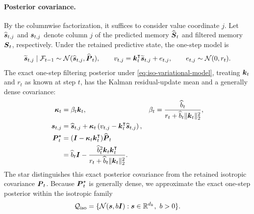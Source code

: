 \documentclass[11pt,letterpaper,logo]{yalearxiv}
\begin{document}
\paragraph{Posterior covariance.}
By the columnwise factorization, it suffices to consider value coordinate $j$. Let
$\widehat{\boldsymbol{s}}_{t,j}$ and $\boldsymbol{s}_{t,j}$ denote column $j$ of the predicted memory
$\widehat{\boldsymbol{S}}_t$ and filtered memory $\boldsymbol{S}_t$, respectively. Under the retained predictive
state, the one-step model is
\begin{equation}
  \widetilde{\boldsymbol{s}}_{t,j}\mid\mathcal{F}_{t-1}
  \sim\mathcal N(\widehat{\boldsymbol{s}}_{t,j},\widehat{\boldsymbol{P}}_t),
  \qquad
  v_{t,j}=\boldsymbol{k}_t^{\intercal}\widetilde{\boldsymbol{s}}_{t,j}+e_{t,j},
  \qquad
  e_{t,j}\sim\mathcal N(0,r_t).
  \label{eq:iso-variational-model}
\end{equation}
The exact one-step filtering posterior under \eqref{eq:iso-variational-model}, treating
$\boldsymbol{k}_t$ and $r_t$ as known at step $t$, has the Kalman residual-update mean and a generally
dense covariance:
\begin{equation}
\begin{aligned}
  \boldsymbol{\kappa}_t
  &=\beta_t\boldsymbol{k}_t,
  &
  \beta_t
  &=\frac{\widehat b_t}{r_t+\widehat b_t\|\boldsymbol{k}_t\|_2^2},
  \\
  \boldsymbol{s}_{t,j}
  &=\widehat{\boldsymbol{s}}_{t,j}
    +\boldsymbol{\kappa}_t
      \left(v_{t,j}-\boldsymbol{k}_t^{\intercal}\widehat{\boldsymbol{s}}_{t,j}\right),
  \\
  \boldsymbol{P}_t^\star
  &=(\boldsymbol{I}-\boldsymbol{\kappa}_t\boldsymbol{k}_t^{\intercal})\widehat{\boldsymbol{P}}_t
  \\
  &=\widehat b_t\boldsymbol{I}
   -\frac{\widehat b_t^2\boldsymbol{k}_t\boldsymbol{k}_t^{\intercal}}
    {r_t+\widehat b_t\|\boldsymbol{k}_t\|_2^2}.
\end{aligned}
  \label{eq:iso-exact-posterior}
\end{equation}
The star distinguishes this exact posterior covariance from the retained isotropic covariance
$\boldsymbol{P}_t$. Because $\boldsymbol{P}_t^\star$ is generally dense, we approximate the exact one-step
posterior within the isotropic family
\begin{equation*}
  \mathcal{Q}_{\mathrm{iso}}
  =\{\mathcal N(\boldsymbol{s},b\boldsymbol{I}):\boldsymbol{s}\in\mathbb{R}^{d_k},\ b>0\}.
\end{equation*}
\end{document}
